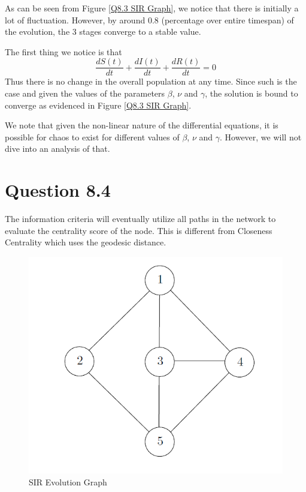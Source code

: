 \documentclass[]{article}
\begin{document}
As can be seen from Figure \ref{Q8.3 SIR Graph}, we notice that there is initially a lot of fluctuation. However, by around 0.8 (percentage over entire timespan) of the evolution, the 3 stages converge to a stable value.

The first thing we notice is that
\[
	\frac{dS(t)}{dt} + \frac{dI(t)}{dt} + \frac{dR(t)}{dt} = 0
\]
Thus there is no change in the overall population at any time. Since such is the case and given the values of the parameters $\beta$, $\nu$ and $\gamma$, the solution is bound to converge as evidenced in Figure \ref{Q8.3 SIR Graph}.

We note that given the non-linear nature of the differential equations, it is possible for chaos to exist for different values of $\beta$, $\nu$ and $\gamma$. However, we will not dive into an analysis of that.

\newpage
\section*{Question 8.4}
 
The information criteria will eventually utilize all paths in the network to evaluate the centrality score of the node. This is different from Closeness Centrality which uses the geodesic distance. 

\begin{figure}[H]
	\includegraphics[width=\linewidth]{8-5.png}
	\caption{SIR Evolution Graph} 
	\label{Q8.5 Graph}
\end{figure}
\end{document}
